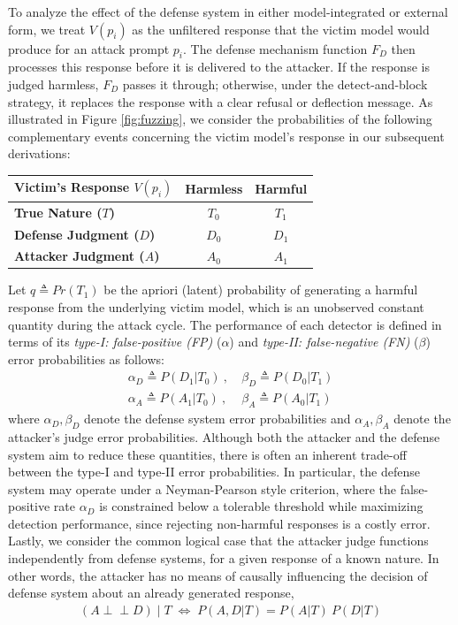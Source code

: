 \documentclass[conference,compsoc]{IEEEtran}
\begin{document}
To analyze the effect of the defense system in either model-integrated or external form, we treat $V(p_i)$ as the unfiltered response that the victim model would produce for an attack prompt $p_i$.
The defense mechanism function $F_D$ then processes this response before it is delivered to the attacker.
If the response is judged harmless, $F_D$ passes it through; otherwise, under the detect-and-block strategy, it replaces the response with a clear refusal or deflection message.
As illustrated in Figure \ref{fig:fuzzing}, we consider the probabilities of the following complementary events concerning the victim model's response in our subsequent derivations:
\begin{table}[h]
    \centering
    \setlength{\tabcolsep}{6pt}
    \renewcommand{\arraystretch}{1.15}
    \begin{tabular}{lcc}
        \toprule
        \textbf{Victim's Response $V(p_i)$} & \textbf{Harmless} & \textbf{Harmful} \\
        \midrule
        \textbf{True Nature ($T$)} & $T_0$ & $T_1$ \\
        \textbf{Defense Judgment ($D$)}      & $D_0$ & $D_1$ \\
        \textbf{Attacker Judgment ($A$)}     & $A_0$ & $A_1$ \\
        \bottomrule
    \end{tabular}
\end{table}

Let $q \triangleq Pr(T_1)$ be the apriori (latent) probability of generating a harmful response from the underlying victim model, which is an unobserved constant quantity during the attack cycle. The performance of each detector is defined in terms of its \textit{type-I: false-positive (FP)} ($\alpha$) and \textit{type-II: false-negative (FN)} ($\beta$) error probabilities as follows:
\begin{align}\label{notationeq}
    \alpha_D \triangleq P(D_1 | T_0) ~,&~ \beta_D \triangleq P(D_0 | T_1)\\
    \alpha_A \triangleq P(A_1 | T_0) ~,&~ \beta_A \triangleq P(A_0 | T_1)
\end{align}
where $\alpha_D,\beta_D$ denote the defense system error probabilities and $\alpha_A,\beta_A$ denote the attacker's judge error probabilities.
Although both the attacker and the defense system aim to reduce these quantities, there is often an inherent trade-off between the type-I and type-II error probabilities. In particular, the defense system may operate under a Neyman-Pearson style criterion, where the false-positive rate $\alpha_D$ is constrained below a tolerable threshold while maximizing detection performance, since rejecting non-harmful responses is a costly error. Lastly, we consider the common logical case that the attacker judge functions independently from defense systems, for a given response of a known nature. In other words,  the attacker has no means of causally influencing the decision of defense system about an already generated response,
\begin{align}\label{indepeq}
    (A \perp\!\!\!\perp D) \mid T \;\Leftrightarrow\;  P(A,D | T) = P(A|T)~P(D|T)
\end{align}
\end{document}
